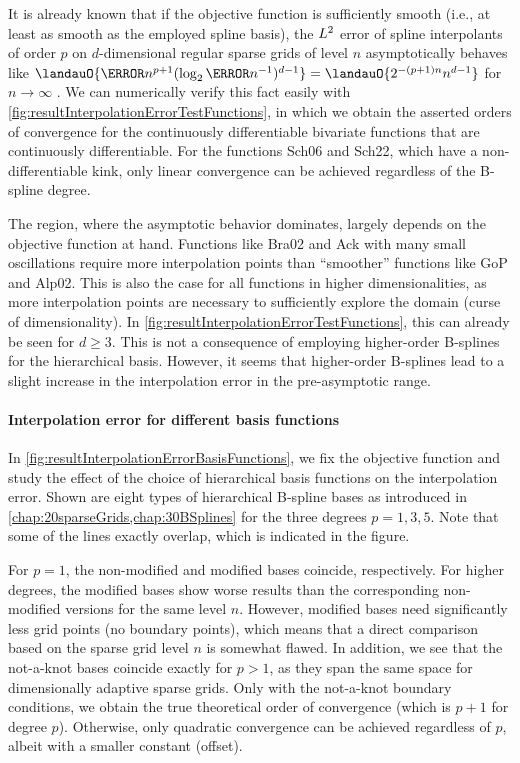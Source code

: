 It is already known that
if the objective function is sufficiently smooth
(i.e., at least as smooth as the employed spline basis),
the $L^2$ error of spline interpolants of order $p$ on
$d$-dimensional regular sparse grids of level $n$
asymptotically behaves like
$\landauO{\ms{n}^{p+1} (\log_2 \ms{n}^{-1})^{d-1}}
= \landauO{2^{-(p+1)n} n^{d-1}}$ for $n \to \infty$ \cite{Sickel11Spline}.
We can numerically verify this fact easily with
\cref{fig:resultInterpolationErrorTestFunctions},
in which we obtain the asserted orders of convergence
for the continuously differentiable bivariate functions that
are continuously differentiable.
For the functions Sch06 and Sch22, which have a non-differentiable kink,
only linear convergence can be achieved regardless of the B-spline degree.

The region, where the asymptotic behavior dominates, largely depends
on the objective function at hand.
Functions like Bra02 and Ack with many small oscillations
require more interpolation points than ``smoother'' functions like
GoP and Alp02.
This is also the case for all functions in higher dimensionalities,
as more interpolation points are necessary to sufficiently explore the domain
(curse of dimensionality).
In \cref{fig:resultInterpolationErrorTestFunctions}, this can already be seen
for $d \ge 3$.
This is not a consequence of employing higher-order B-splines for
the hierarchical basis.
However, it seems that higher-order B-splines lead to a slight increase
in the interpolation error in the pre-asymptotic range.

\paragraph{Interpolation error for different basis functions}

In \cref{fig:resultInterpolationErrorBasisFunctions},
we fix the objective function and study the effect of the choice
of hierarchical basis functions on the interpolation error.
Shown are eight types of hierarchical B-spline bases as introduced in
\cref{chap:20sparseGrids,chap:30BSplines} for the three degrees
$p = 1, 3, 5$.
Note that some of the lines exactly overlap, which is indicated in
the figure.

For $p = 1$, the non-modified and modified bases coincide,
respectively.
For higher degrees, the modified bases show worse results than
the corresponding non-modified versions for the same level $n$.
However, modified bases need significantly less grid points
(no boundary points),
which means that a direct comparison based on the sparse grid level $n$
is somewhat flawed.
%
In addition, we see that the not-a-knot bases coincide exactly for $p > 1$,
as they span the same space for dimensionally adaptive sparse grids.
Only with the not-a-knot boundary conditions, we obtain the true
theoretical order of convergence (which is $p + 1$ for degree $p$).
Otherwise, only quadratic convergence can be achieved regardless of $p$,
albeit with a smaller constant (offset).

